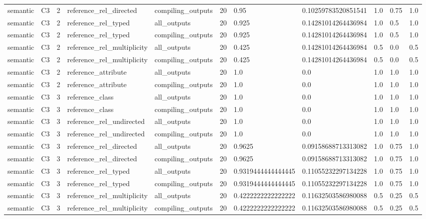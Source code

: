 \begin{tabular}{lllllllllll}
semantic & C3 & 2 & reference\_rel\_directed & compiling\_outputs & 20 & 0.95 & 0.10259783520851541 & 1.0 & 0.75 & 1.0 \\
semantic & C3 & 2 & reference\_rel\_typed & all\_outputs & 20 & 0.925 & 0.14281014264436984 & 1.0 & 0.5 & 1.0 \\
semantic & C3 & 2 & reference\_rel\_typed & compiling\_outputs & 20 & 0.925 & 0.14281014264436984 & 1.0 & 0.5 & 1.0 \\
semantic & C3 & 2 & reference\_rel\_multiplicity & all\_outputs & 20 & 0.425 & 0.14281014264436984 & 0.5 & 0.0 & 0.5 \\
semantic & C3 & 2 & reference\_rel\_multiplicity & compiling\_outputs & 20 & 0.425 & 0.14281014264436984 & 0.5 & 0.0 & 0.5 \\
semantic & C3 & 2 & reference\_attribute & all\_outputs & 20 & 1.0 & 0.0 & 1.0 & 1.0 & 1.0 \\
semantic & C3 & 2 & reference\_attribute & compiling\_outputs & 20 & 1.0 & 0.0 & 1.0 & 1.0 & 1.0 \\
semantic & C3 & 3 & reference\_class & all\_outputs & 20 & 1.0 & 0.0 & 1.0 & 1.0 & 1.0 \\
semantic & C3 & 3 & reference\_class & compiling\_outputs & 20 & 1.0 & 0.0 & 1.0 & 1.0 & 1.0 \\
semantic & C3 & 3 & reference\_rel\_undirected & all\_outputs & 20 & 1.0 & 0.0 & 1.0 & 1.0 & 1.0 \\
semantic & C3 & 3 & reference\_rel\_undirected & compiling\_outputs & 20 & 1.0 & 0.0 & 1.0 & 1.0 & 1.0 \\
semantic & C3 & 3 & reference\_rel\_directed & all\_outputs & 20 & 0.9625 & 0.09158688713313082 & 1.0 & 0.75 & 1.0 \\
semantic & C3 & 3 & reference\_rel\_directed & compiling\_outputs & 20 & 0.9625 & 0.09158688713313082 & 1.0 & 0.75 & 1.0 \\
semantic & C3 & 3 & reference\_rel\_typed & all\_outputs & 20 & 0.9319444444444445 & 0.11055232297134228 & 1.0 & 0.75 & 1.0 \\
semantic & C3 & 3 & reference\_rel\_typed & compiling\_outputs & 20 & 0.9319444444444445 & 0.11055232297134228 & 1.0 & 0.75 & 1.0 \\
semantic & C3 & 3 & reference\_rel\_multiplicity & all\_outputs & 20 & 0.4222222222222222 & 0.11632503586980088 & 0.5 & 0.25 & 0.5 \\
semantic & C3 & 3 & reference\_rel\_multiplicity & compiling\_outputs & 20 & 0.4222222222222222 & 0.11632503586980088 & 0.5 & 0.25 & 0.5 \\

\end{tabular}
